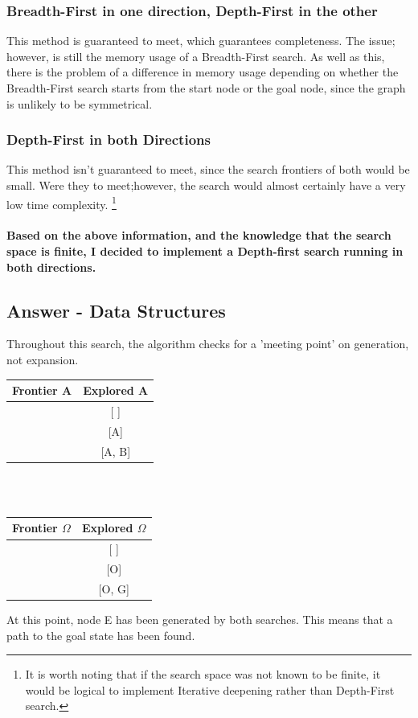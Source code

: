 \documentclass{article}
\begin{document}
\subsubsection{Breadth-First in one direction, Depth-First in the other}
This method is guaranteed to meet, which guarantees completeness. The issue; however, is still the memory usage of a Breadth-First search. As well as this, there is the problem of a difference in memory usage depending on whether the Breadth-First search starts from the start node or the goal node, since the graph is unlikely to be symmetrical.
\subsubsection{Depth-First in both Directions}
This method isn't guaranteed to meet, since the search frontiers of both would be small. Were they to meet;however, the search would almost certainly have a very low time complexity. \footnote{It is worth noting that if the search space was not known to be finite, it would be logical to implement Iterative deepening rather than Depth-First search.}
\\~\\
\textbf{Based on the above information, and the knowledge that the search space is finite, I decided to implement a Depth-first search running in both directions.} 
\subsection{Answer - Data Structures}
Throughout this search, the algorithm checks for a 'meeting point' on generation, not expansion.
\\
\begin{center}
    \begin{tabular}{ l | c}
    
    \hline
    \textbf{Frontier A} & \textbf{Explored A}\\
    
    \hline
    [A] &  [ ] \\ \hline 
    [B, C, D] & [A] \\ \hline
    [C, D, E] & [A, B] \\ \hline
        
    \end{tabular}
    \\~\\
    \begin{tabular}{ l | c}
    
    \hline
    \textbf{Frontier $\Omega$} & \textbf{Explored $\Omega$}\\
    
    \hline
    [O] &  [ ] \\ \hline 
    [G, I, M, N] & [O] \\ \hline
    [E, F, I, M, N] & [O, G] \\ \hline
       
    \end{tabular}
\end{center}  
At this point, node E has been generated by both searches. This means that a path to the goal state has been found.
\end{document}
